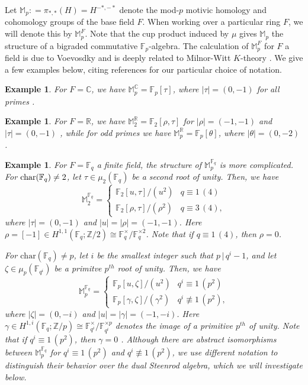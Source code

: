 \documentclass{amsart}
\newtheorem{example}[theorem]{Example}
\theoremstyle{plain}
\numberwithin{theorem}{section}
\numberwithin{equation}{section}
\numberwithin{figure}{section}
\newcommand{\mF}{{\mathbb F}}
\newcommand{\0}{\langle 0 \rangle }
\begin{document}
Let $\mathbb{M}_p: = \pi_{*,*} (H) = H^{-*,-*}$ denote the mod-$p$ motivic homology and cohomology groups of the base field $F$. When working over a particular ring $F$, we will denote this by $\mathbb{M}_p^F.$ Note that the cup product induced by $\mu$ gives $\mathbb{M}_p$ the structure of a bigraded commutative $\mF_p$-algebra. The calculation of $\mathbb{M}_p^F$ for $F$ a field is due to Voevosdky and is deeply related to Milnor-Witt $K$-theory \cite{Voemotiviccohomology}. We give a few examples below, citing references for our particular choice of notation.
\begin{example}
\rm For $F = \mathbb{C}$, we have $\mathbb{M}_p^\mathbb{C} = \mathbb{F}_p[\tau]$, where $|\tau|=(0, -1)$ for all primes \cite{Voereduced}.
\end{example}
\begin{example}
\rm For $F=\mathbb{R}$, we have $\mathbb{M}_2^\mathbb{R} = \mathbb{F}_2[\rho, \tau]$ for $|\rho| = (-1, -1)$ and $|\tau|=(0, -1)$ \cite{Voemotiviccohomology}, while for odd primes we have $\mathbb{M}_p^\mathbb{R} = \mathbb{F}_p[\theta]$, where $|\theta|=(0, -2)$ \cite{GreRog-Segal}.
\end{example}
\begin{example}
\rm For $F = \mathbb{F}_q$ a finite field, the structure of $\mathbb{M}_p^{\mathbb{F}_q}$ is more complicated. For $\textup{char}(\mathbb{F}_q) \neq 2$, let $\tau \in \mu_2(\mathbb{F}_q)$ be a second root of unity. Then, we have
\[\mathbb{M}_2^{\mathbb{F}_q} =  \left\{ \begin{array}{cl}
\mathbb{F}_2[u, \tau]/(u^2) &  q \equiv 1 \, (4)\\
\mathbb{F}_2[\rho, \tau]/(\rho^2) & q \equiv 3 \, (4),
\end{array} \right. \] 
where $|\tau| = (0, -1)$ and $|u|=|\rho| = (-1, -1)$. Here $\rho = [-1] \in  H^{1,1}(\mathbb{F}_q; \mathbb{Z}/2) \cong \mathbb{F}_q^\times/\mathbb{F}_q^{\times 2}$. Note that if $q \equiv 1 \, (4)$, then $\rho =0$.

For $\text{char}(\mathbb{F}_q) \neq p$, let $i$ be the smallest integer such that $p\,|\,q^i-1$, and let $\zeta \in \mu_p(\mathbb{F}_{q^i})$ be a primitve $p^{th}$ root of unity. Then, we have
\[\mathbb{M}_p^{\mathbb{F}_q} =  \left\{\begin{array}{cl}
\mathbb{F}_p[u,\zeta]/(u^2)  & q^i \equiv 1 \, (p^2) \\
\mathbb{F}_p[\gamma, \zeta]/(\gamma^2)  & q^i \not\equiv 1 \, (p^2),
\end{array} \right. \]
where $|\zeta| = (0, -i)$ and $|u| = |\gamma| = (-1, -i)$. Here $\gamma \in H^{1, i}(\mathbb{F}_q; \mathbb{Z}/p) \cong \mathbb{F}_{q^i}^\times/\mathbb{F}_{q^i}^{\times p}$ denotes the image of a primitive $p^{th}$ of unity. Note that if $q^i \equiv 1 \, (p^2)$, then $\gamma=0$ \cite{Wilson16}. Although there are abstract isomorphisms between $\mathbb{M}_p^{\mathbb{F}_q}$ for $q^i \equiv 1 \, (p^2)$ and $q^i \not \equiv 1 \, (p^2)$, we use different notation to distinguish their behavior over the dual Steenrod algebra, which we will investigate below.
\end{example}
\end{document}
